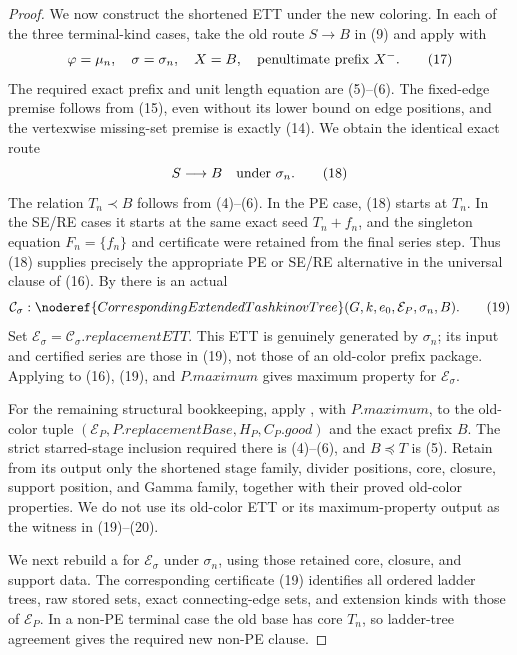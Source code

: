\begin{proof}
We now construct the shortened ETT under the new coloring.  In each of the
three terminal-kind cases, take the old route \(S\to B\) in (9) and apply
 with
\[
       \varphi=\mu_n,\quad \sigma=\sigma_n,\quad
       X=B,\quad\hbox{penultimate prefix }X^- .                \tag{17}
\]
The required exact prefix and unit length equation are (5)--(6).  The
fixed-edge premise follows from (15), even without its lower bound on edge
positions, and the vertexwise missing-set premise is exactly (14).  We
obtain the identical exact route
\[
                              S\longrightarrow B
                    \quad\hbox{under }\sigma_n.                \tag{18}
\]
The relation \(T_n\prec B\) follows from (4)--(6).  In the PE case, (18)
starts at \(T_n\).  In the SE/RE cases it starts at the same exact seed
\(T_n+f_n\), and the singleton equation \(F_n=\{f_n\}\) and
 certificate were retained from the final
series step.  Thus (18) supplies precisely the appropriate PE or SE/RE
alternative in the universal clause of (16).  By
 there is an actual
\[
 \mathcal C_\sigma:
   \noderef{CorrespondingExtendedTashkinovTree}
       (G,k,e_0,\mathcal E_P,\sigma_n,B).                      \tag{19}
\]
Set
\(\mathcal E_\sigma=\mathcal C_\sigma.\mathit{replacementETT}\).
This ETT is genuinely generated by \(\sigma_n\); its input and certified
series are those in (19), not those of an old-color prefix package.
Applying  to (16), (19), and
\(P.\mathit{maximum}\) gives maximum property for
\(\mathcal E_\sigma\).                                       

For the remaining structural bookkeeping, apply
, with
\(P.\mathit{maximum}\), to the old-color tuple
\((\mathcal E_P,P.\mathit{replacementBase},H_P,C_P.\mathit{good})\)
and the exact prefix \(B\).  The strict starred-stage inclusion required
there is (4)--(6), and \(B\preccurlyeq T\) is (5).  Retain from its output
only the shortened stage family, divider positions, core, closure, support
position, and Gamma family, together with their proved old-color
properties.  We do not use its old-color ETT or its maximum-property output
as the witness in (19)--(20).

We next rebuild a  for
\(\mathcal E_\sigma\) under \(\sigma_n\), using those retained core,
closure, and support data.  The corresponding certificate (19) identifies
all ordered ladder trees, raw stored sets, exact connecting-edge sets, and
extension kinds with those of \(\mathcal E_P\).  In a non-PE terminal
case the old base has core \(T_n\), so ladder-tree agreement gives the
required new non-PE clause.


\end{proof}
